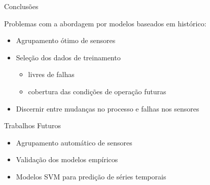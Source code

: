 \documentclass{beamer}
\begin{document}
\begin{frame}{Conclusões}
    
    Problemas com a abordagem por modelos baseados em histórico:
    \begin{itemize}
        \item Agrupamento ótimo de sensores
        \item Seleção dos dados de treinamento
            \begin{itemize}
                \item livres de falhas
                \item cobertura das condições de operação futuras
            \end{itemize}
        \item Discernir entre mudanças no processo e falhas nos sensores
    \end{itemize}
    
\end{frame}

\begin{frame}{Trabalhos Futuros}
    \begin{itemize}
        \item Agrupamento automático de sensores
        \item Validação dos modelos empíricos
        \item Modelos SVM para predição de séries temporais
    \end{itemize}

\end{frame}

\begin{frame}
    \titlepage
    
\end{frame}
\end{document}
